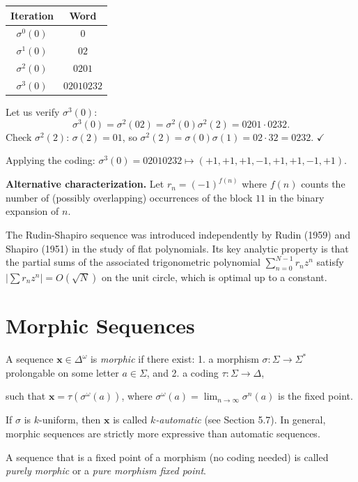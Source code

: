 \begin{example}

\begin{center}
\begin{tabular}{cc}
\toprule
Iteration & Word \\
\midrule
$\sigma^0(0)$ & $0$ \\
$\sigma^1(0)$ & $02$ \\
$\sigma^2(0)$ & $0201$ \\
$\sigma^3(0)$ & $02010232$ \\
\bottomrule
\end{tabular}
\end{center}

Let us verify $\sigma^3(0)$:
\[\sigma^3(0) = \sigma^2(02) = \sigma^2(0)\sigma^2(2) = 0201 \cdot 0232.\]
Check $\sigma^2(2)$: $\sigma(2) = 01$, so $\sigma^2(2) = \sigma(0)\sigma(1) = 02 \cdot 32 = 0232$. $\checkmark$

Applying the coding: $\sigma^3(0) = 02010232 \mapsto (+1,+1,+1,-1,+1,+1,-1,+1)$.

\textbf{Alternative characterization.} Let $r_n = (-1)^{f(n)}$ where $f(n)$ counts the number of (possibly overlapping) occurrences of the block $11$ in the binary expansion of $n$.

The Rudin-Shapiro sequence was introduced independently by Rudin (1959) and Shapiro (1951) in the study of flat polynomials. Its key analytic property is that the partial sums of the associated trigonometric polynomial $\sum_{n=0}^{N-1} r_n z^n$ satisfy $|\sum r_n z^n| = O(\sqrt{N})$ on the unit circle, which is optimal up to a constant.
\end{example}



\section{Morphic Sequences}

\begin{definition}
A sequence $\mathbf{x} \in \Delta^\omega$ is \textit{morphic} if there exist:
1. a morphism $\sigma: \Sigma \to \Sigma^*$ prolongable on some letter $a \in \Sigma$, and
2. a coding $\tau: \Sigma \to \Delta$,

such that $\mathbf{x} = \tau(\sigma^\omega(a))$, where $\sigma^\omega(a) = \lim_{n\to\infty} \sigma^n(a)$ is the fixed point.

If $\sigma$ is $k$-uniform, then $\mathbf{x}$ is called \textit{$k$-automatic} (see Section 5.7). In general, morphic sequences are strictly more expressive than automatic sequences.

A sequence that is a fixed point of a morphism (no coding needed) is called \textit{purely morphic} or a \textit{pure morphism fixed point}.
\end{definition}

